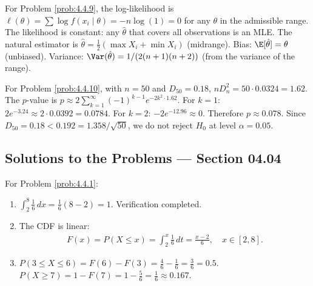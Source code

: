 \begin{sugerencia}
	\label{sug:4.4.9}
	For Problem \ref{prob:4.4.9}, the log-likelihood is $\ell(\theta) = \sum \log f(x_i \mid \theta) = -n \log(1) = 0$ for any $\theta$ in the admissible range. The likelihood is constant: any $\hat{\theta}$ that covers all observations is an MLE. The natural estimator is $\hat{\theta} = \frac{1}{2}(\max X_i + \min X_i)$ (midrange). Bias: $\E[\hat{\theta}] = \theta$ (unbiased). Variance: $\Var(\hat{\theta}) = 1/(2(n+1)(n+2))$ (from the variance of the range).
\end{sugerencia}

\begin{sugerencia}
	\label{sug:4.4.10}
	For Problem \ref{prob:4.4.10}, with $n = 50$ and $D_{50} = 0.18$, $nD_{n}^{2} = 50 \cdot 0.0324 = 1.62$. The $p$-value is $p \approx 2 \sum_{k=1}^{\infty}(-1)^{k-1} e^{-2k^{2} \cdot 1.62}$. For $k=1$: $2 e^{-3.24} \approx 2 \cdot 0.0392 = 0.0784$. For $k=2$: $-2 e^{-12.96} \approx 0$. Therefore $p \approx 0.078$. Since $D_{50} = 0.18 < 0.192 = 1.358/\sqrt{50}$, we do not reject $H_{0}$ at level $\alpha = 0.05$.
\end{sugerencia}

\subsection*{Solutions to the Problems --- Section 04.04}

\begin{solucion}
	\label{sol:4.4.1}
	For Problem \ref{prob:4.4.1}:
	\begin{enumerate}
		\item $\int_{2}^{8} \frac{1}{6}\,dx = \frac{1}{6}(8-2) = 1$. Verification completed.
		\item The CDF is linear:
		\begin{align*}
			F(x) = P(X \le x) = \int_{2}^{x} \frac{1}{6}\,dt = \frac{x-2}{6}, \quad x \in [2, 8].
		\end{align*}
		\item $P(3 \le X \le 6) = F(6) - F(3) = \frac{4}{6} - \frac{1}{6} = \frac{3}{6} = 0.5$. $P(X \ge 7) = 1 - F(7) = 1 - \frac{5}{6} = \frac{1}{6} \approx 0.167$.
	\end{enumerate}
\end{solucion}

